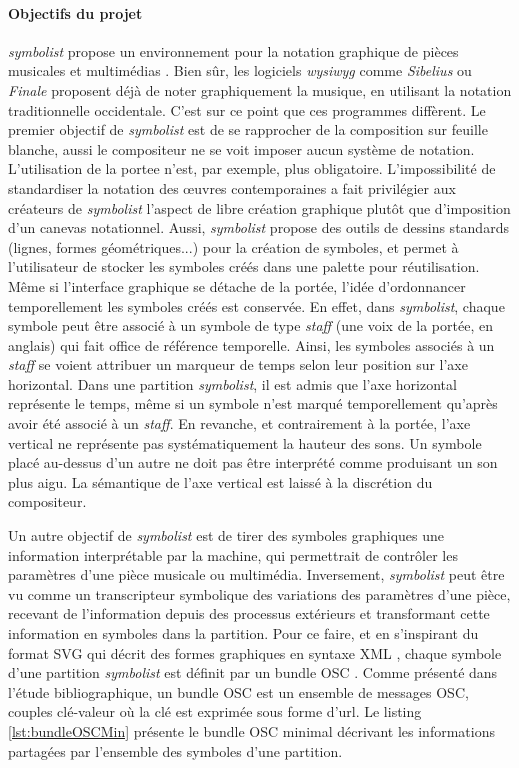 \paragraph{Objectifs du projet} \textit{symbolist} propose un environnement pour la notation graphique de pièces musicales et multimédias \cite{gottfried2018}. Bien sûr, les logiciels \textit{wysiwyg} comme \textit{Sibelius} ou \textit{Finale} proposent déjà de noter graphiquement la musique, en utilisant la notation traditionnelle occidentale. C'est sur ce point que ces programmes diffèrent.
Le premier objectif de \textit{symbolist} est de se rapprocher de la composition sur feuille blanche, aussi le compositeur ne se voit imposer aucun système de notation. L'utilisation de la \gls{portee} n'est, par exemple, plus obligatoire.
L'impossibilité de standardiser la notation des œuvres contemporaines a fait privilégier aux créateurs de \textit{symbolist} l'aspect de libre création graphique plutôt que d'imposition d'un canevas notationnel.
Aussi, \textit{symbolist} propose des outils de dessins standards (lignes, formes géométriques...) pour la création de symboles, et permet à l'utilisateur de stocker les symboles créés dans une palette pour réutilisation.
Même si l'interface graphique se détache de la portée, l'idée d'ordonnancer temporellement les symboles créés est conservée. En effet, dans \textit{symbolist}, chaque symbole peut être associé à un symbole de type \textit{staff} (une voix de la portée, en anglais) qui fait office de référence temporelle. Ainsi, les symboles associés à un \textit{staff} se voient attribuer un marqueur de temps selon leur position sur l'axe horizontal. Dans une partition \textit{symbolist}, il est admis que l'axe horizontal représente le temps, même si un symbole n'est marqué temporellement qu'après avoir été associé à un \textit{staff}. En revanche, et contrairement à la portée, l'axe vertical ne représente pas systématiquement la hauteur des sons. Un symbole placé au-dessus d'un autre ne doit pas être interprété comme produisant un son plus aigu. La sémantique de l'axe vertical est laissé à la discrétion du compositeur.

Un autre objectif de \textit{symbolist} est de tirer des symboles graphiques une information interprétable par la machine, qui permettrait de contrôler les paramètres d'une pièce musicale ou multimédia. Inversement, \textit{symbolist} peut être vu comme un transcripteur symbolique des variations des paramètres d'une pièce, recevant de l'information depuis des processus extérieurs et transformant cette information en symboles dans la partition.   
Pour ce faire, et en s'inspirant du format SVG qui décrit des formes graphiques en syntaxe XML \cite{svg2011}, chaque symbole d'une partition \textit{symbolist} est définit par un bundle OSC \cite{wright2002}. Comme présenté dans l'étude bibliographique, un bundle OSC est un ensemble de messages OSC, couples clé-valeur où la clé est exprimée sous forme d'url.
Le listing \ref{lst:bundleOSCMin} présente le bundle OSC minimal décrivant les informations partagées par l'ensemble des symboles d'une partition.

